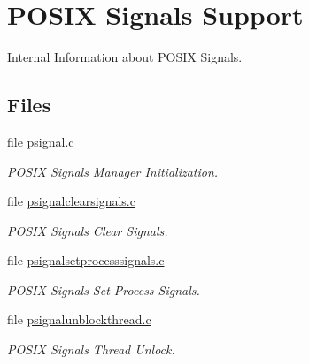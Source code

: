 \hypertarget{group__POSIX__SIGNALS}{}\section{P\+O\+S\+IX Signals Support}
\label{group__POSIX__SIGNALS}


Internal Information about P\+O\+S\+IX Signals.  


\subsection*{Files}
\begin{DoxyCompactItemize}
\item 
file \mbox{\hyperlink{psignal_8c}{psignal.\+c}}
\begin{DoxyCompactList}\small\item\em P\+O\+S\+IX Signals Manager Initialization. \end{DoxyCompactList}\item 
file \mbox{\hyperlink{psignalclearsignals_8c}{psignalclearsignals.\+c}}
\begin{DoxyCompactList}\small\item\em P\+O\+S\+IX Signals Clear Signals. \end{DoxyCompactList}\item 
file \mbox{\hyperlink{psignalsetprocesssignals_8c}{psignalsetprocesssignals.\+c}}
\begin{DoxyCompactList}\small\item\em P\+O\+S\+IX Signals Set Process Signals. \end{DoxyCompactList}\item 
file \mbox{\hyperlink{psignalunblockthread_8c}{psignalunblockthread.\+c}}
\begin{DoxyCompactList}\small\item\em P\+O\+S\+IX Signals Thread Unlock. \end{DoxyCompactList}\end{DoxyCompactItemize}
